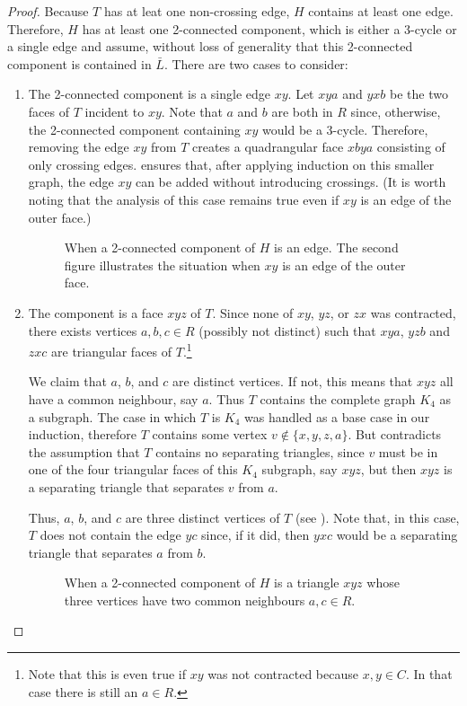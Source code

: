 \documentclass{patmorin}
\begin{document}
\begin{proof}
   Because $T$ has at leat one non-crossing edge, $H$ contains at least one
   edge.  Therefore, $H$ has at least one 2-connected component, 
   which is either a 3-cycle
   or a single edge and assume, without loss of generality that this
   2-connected component is contained in $\bar L$.  
   There are two cases to consider:
   \begin{enumerate}
	\item The 2-connected component is a single edge $xy$.	Let $xya$
	and $yxb$ be the two faces of $T$ incident to $xy$.  Note that
	$a$ and $b$ are both in $R$ since, otherwise, the 2-connected
	component containing $xy$ would be a 3-cycle.
	Therefore, removing the edge $xy$ from $T$ creates a
	quadrangular face $xbya$ consisting of only crossing
	edges.  ensures that, after applying induction
	on this smaller graph, the edge $xy$ can be added without
	introducing crossings.  (It is worth noting that the analysis
	of this case remains true even if $xy$ is an edge of the
	outer face.)
        \begin{figure}
           \caption{When a 2-connected component of $H$ is an edge. The second figure illustrates the situation when $xy$ is an edge of the outer face.}
        \end{figure}
        \item The component is a face $xyz$ of $T$.  Since none of $xy$,
        $yz$, or $zx$ was contracted, there exists vertices $a,b,c\in R$
        (possibly not distinct) such that $xya$, $yzb$ and $zxc$ are
        triangular faces of $T$.\footnote{Note that this is even true if
        $xy$ was not contracted because $x,y\in C$. In that case there
        is still an $a\in R$.} 

        We claim that $a$, $b$, and $c$ are distinct vertices. If not,
        this means that $xyz$ all have a common neighbour, say $a$. Thus
        $T$ contains the complete graph $K_4$ as a subgraph.  The case in
        which $T$ is $K_4$ was handled as a base case in our induction,
        therefore $T$ contains some vertex $v\not\in\{x,y,z,a\}$. But
        contradicts the assumption that $T$ contains no separating
        triangles, since $v$ must be in one of the four triangular faces
        of this $K_4$ subgraph, say $xyz$, but then $xyz$ is a separating
        triangle that separates $v$ from $a$.

        Thus, $a$, $b$, and $c$ are three distinct vertices of $T$
        (see ). Note that, in this case, $T$ does not
        contain the edge $yc$ since, if it did, then $yxc$ would be
        a separating triangle that separates $a$ from $b$.
        \begin{figure}
           \caption{When a 2-connected component of $H$ is a triangle $xyz$ whose three vertices have two common neighbours $a,c\in R$.}
        \end{figure}
 

\end{enumerate}
\end{proof}
\end{document}
